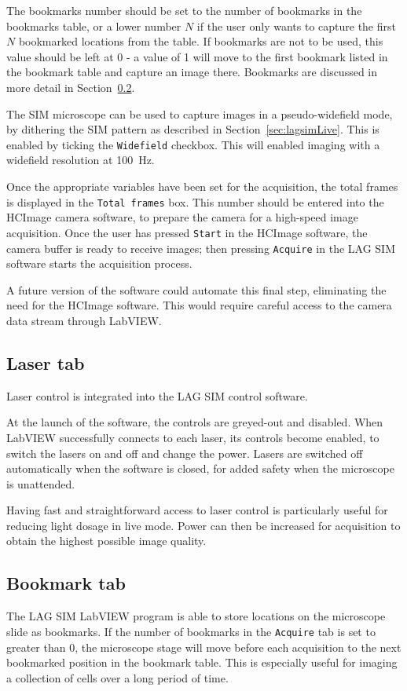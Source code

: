 The bookmarks number should be set to the number of bookmarks in the bookmarks table, or a lower number $N$ if the user only wants to capture the first $N$ bookmarked locations from the table. 
If bookmarks are not to be used, this value should be left at 0 - a value of 1 will move to the first bookmark listed in the bookmark table and capture an image there. 
Bookmarks are discussed in more detail in Section~\ref{sec:lagsimBookmarks}. 

The SIM microscope can be used to capture images in a pseudo-widefield mode, by dithering the SIM pattern as described in Section~\ref{sec:lagsimLive}. 
This is enabled by ticking the \texttt{Widefield} checkbox. 
This will enabled imaging with a widefield resolution at \SI{100}{\hertz}. 

Once the appropriate variables have been set for the acquisition, the total frames is displayed in the \texttt{Total frames} box. 
This number should be entered into the HCImage camera software, to prepare the camera for a high-speed image acquisition. 
Once the user has pressed \texttt{Start} in the HCImage software, the camera buffer is ready to receive images; then pressing \texttt{Acquire} in the LAG SIM software starts the acquisition process. 

A future version of the software could automate this final step, eliminating the need for the HCImage software.
This would require careful access to the camera data stream through LabVIEW. 


\subsection{Laser tab}
Laser control is integrated into the LAG SIM control software. 

At the launch of the software, the controls are greyed-out and disabled. 
When LabVIEW successfully connects to each laser, its controls become enabled, to switch the lasers on and off and change the power. 
Lasers are switched off automatically when the software is closed, for added safety when the microscope is unattended. 

Having fast and straightforward access to laser control is particularly useful for reducing light dosage in live mode.
Power can then be increased for acquisition to obtain the highest possible image quality. 


\subsection{Bookmark tab} \label{sec:lagsimBookmarks}
The LAG SIM LabVIEW program is able to store locations on the microscope slide as bookmarks.
If the number of bookmarks in the \texttt{Acquire} tab is set to greater than 0, the microscope stage will move before each acquisition to the next bookmarked position in the bookmark table. 
This is especially useful for imaging a collection of cells over a long period of time. 

